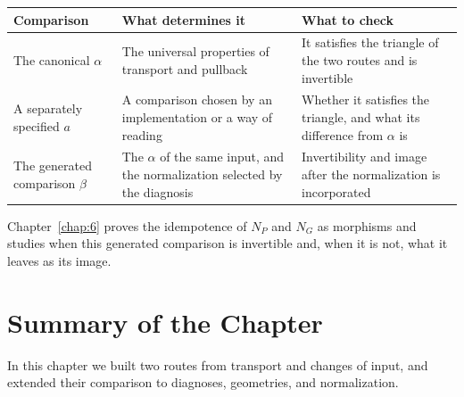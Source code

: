 \begin{construction}
\begin{xltabular}{\linewidth}{@{}LLL@{}}
\toprule
Comparison & What determines it & What to check \\
\midrule
\endhead
The canonical $\alpha$ & The universal properties of transport and pullback & It satisfies
the triangle of the two routes and is invertible \\
\addlinespace[3pt]
A separately specified $a$ & A comparison chosen by an implementation or a way of reading &
Whether it satisfies the triangle, and what its difference from $\alpha$ is \\
\addlinespace[3pt]
The generated comparison $\beta$ & The $\alpha$ of the same input, and the normalization
selected by the diagnosis & Invertibility and image after the normalization is
incorporated \\
\bottomrule
\end{xltabular}

Chapter~\ref{chap:6} proves the idempotence of $N_P$ and $N_G$ as morphisms and studies
when this generated comparison is invertible and, when it is not, what it leaves as its
image.

\end{construction}

\section*{Summary of the Chapter}

In this chapter we built two routes from transport and changes of input, and extended
their comparison to diagnoses, geometries, and normalization.

